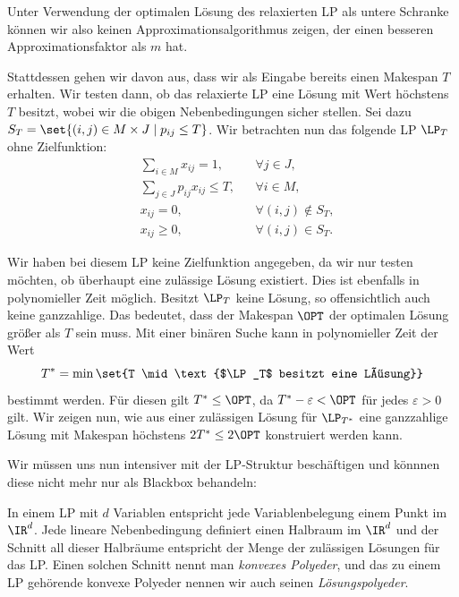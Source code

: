 \documentclass[language=ngerman,algolist]{TemplateLecture}
\begin{document}
Unter Verwendung der optimalen Lösung des relaxierten LP als untere Schranke können wir also keinen Approximationsalgorithmus zeigen, der einen besseren Approximationsfaktor als $m$ hat. 

Stattdessen gehen wir davon aus, dass wir als Eingabe bereits einen Makespan $T$ erhalten. Wir testen dann, ob das relaxierte LP eine Lösung mit Wert höchstens $T$ besitzt, wobei wir die obigen Nebenbedingungen sicher stellen. Sei dazu $S_T = \set{(i, j) \in M \times J \mid p_{ij} \leq T}$. Wir betrachten nun das folgende LP $\LP_T$ ohne Zielfunktion:
\begin{align}
    & \sum_{i \in M} x_{ij} = 1, && \forall j \in J, \label{eq:schedulingLPFirst} \\
    & \sum_{j \in J} p_{ij} x_{ij} \leq T, && \forall i \in M, \label{eq:schedulingLPSecond} \\
    & x_{ij} = 0, && \forall (i,j) \notin S_T, \label{eq:schedulingLPThird} \\
    & x_{ij} \geq 0, && \forall (i,j) \in S_T. \label{eq:schedulingLPFourth}
\end{align}

Wir haben bei diesem LP keine Zielfunktion angegeben, da wir nur testen möchten, ob überhaupt eine zulässige Lösung existiert. Dies ist ebenfalls in polynomieller Zeit möglich. Besitzt $\LP_T$ keine Lösung, so offensichtlich auch keine ganzzahlige. Das bedeutet, dass der Makespan $\OPT$ der optimalen Lösung größer als $T$ sein muss. Mit einer binären Suche kann in polynomieller Zeit der Wert 
\begin{equation*}
    T^* = \min\set{T \mid \text{$\LP_T$ besitzt eine Lösung}}
\end{equation*}
bestimmt werden. Für diesen gilt $T^* \leq \OPT$, da $T^* - \varepsilon < \OPT$ für jedes $\varepsilon > 0$ gilt. Wir zeigen nun, wie aus einer zulässigen Lösung für $\LP_{T^*}$ eine ganzzahlige Lösung mit Makespan höchstens $2T^* \leq 2\OPT$ konstruiert werden kann.

Wir müssen uns nun intensiver mit der LP-Struktur beschäftigen und könnnen diese nicht mehr nur als Blackbox behandeln:

In einem LP mit $d$ Variablen entspricht jede Variablenbelegung einem Punkt im $\IR^d$. Jede lineare Nebenbedingung definiert einen Halbraum im $\IR^d$ und der Schnitt all dieser Halbräume entspricht der Menge der zulässigen Lösungen für das LP. Einen solchen Schnitt nennt man \emph{konvexes Polyeder}, und das zu einem LP gehörende konvexe Polyeder nennen wir auch seinen \emph{Lösungspolyeder}.
\end{document}
